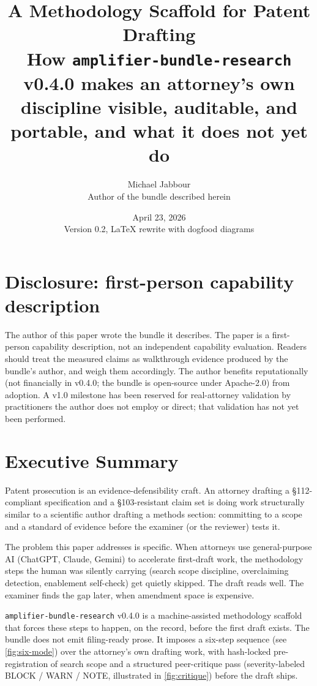 \documentclass[11pt,letterpaper]{article}
\title{A Methodology Scaffold for Patent Drafting\\
\large How \texttt{amplifier-bundle-research} v0.4.0 makes an attorney's
own discipline visible, auditable, and portable, and what it does not
yet do}
\author{Michael Jabbour\\
\small{Author of the bundle described herein}}
\date{April 23, 2026 \\ \small{Version 0.2, LaTeX rewrite with dogfood diagrams}}
\begin{document}
\maketitle

\section*{Disclosure: first-person capability description}

The author of this paper wrote the bundle it describes. The paper is
a first-person capability description, not an independent capability
evaluation. Readers should treat the measured claims as walkthrough
evidence produced by the bundle's author, and weigh them accordingly.
The author benefits reputationally (not financially in v0.4.0; the
bundle is open-source under Apache-2.0) from adoption. A v1.0
milestone has been reserved for real-attorney validation by
practitioners the author does not employ or direct; that validation
has not yet been performed.

\section*{Executive Summary}

Patent prosecution is an evidence-defensibility craft. An attorney
drafting a \S112-compliant specification and a \S103-resistant claim
set is doing work structurally similar to a scientific author drafting
a methods section: committing to a scope and a standard of evidence
before the examiner (or the reviewer) tests it.

The problem this paper addresses is specific. When attorneys use
general-purpose AI (ChatGPT, Claude, Gemini) to accelerate first-draft
work, the methodology steps the human was silently carrying (search
scope discipline, overclaiming detection, enablement self-check) get
quietly skipped. The draft reads well. The examiner finds the gap
later, when amendment space is expensive.

\texttt{amplifier-bundle-research} v0.4.0 is a machine-assisted
methodology scaffold that forces these steps to happen, on the record,
before the first draft exists. The bundle does not emit filing-ready
prose. It imposes a six-step sequence (see \cref{fig:six-mode})
over the attorney's own drafting work, with hash-locked
pre-registration of search scope and a structured peer-critique pass
(severity-labeled BLOCK / WARN / NOTE, illustrated in
\cref{fig:critique}) before the draft ships.
\end{document}
